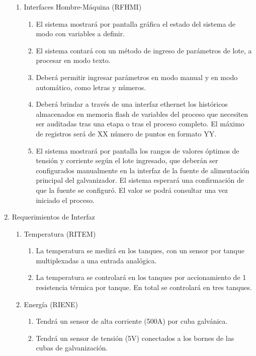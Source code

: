 \begin{enumerate}
\begin{enumerate}
\item Interfaces Hombre-Máquina (RFHMI) \footnotemark
\begin{enumerate}
\item El sistema mostrará por pantalla gráfica el estado del sistema de modo con variables a definir.
\item El sistema contará con un método de ingreso de parámetros de lote, a procesar en modo texto.
\item Deberá permitir ingresar parámetros en modo manual y en modo automático, como letras y números.
\item Deberá brindar a través de una interfaz ethernet los históricos almacenados en memoria flash de variables del proceso que necesiten ser auditadas tras una etapa o tras el proceso completo. El máximo de registros será de XX número de puntos en
formato YY. \footnotemark
\item El sistema mostrará por pantalla los rangos de valores óptimos de tensión y corriente según el lote ingresado, que deberán ser configurados manualmente en la interfaz de la fuente de alimentación principal del galvanizador. El sistema esperará una confirmación de que la fuente se configuró. El valor se podrá consultar una vez iniciado el proceso.
\end{enumerate}

\end{enumerate}

\item Requerimientos de Interfaz
\begin{enumerate}

\item Temperatura (RITEM)
\begin{enumerate}
\item La temperatura se medirá en los tanques, con un sensor por tanque multiplexadas a una entrada analógica.
\item La temperatura se controlará en los tanques por accionamiento de 1 resistencia térmica por tanque. En total se controlará en tres tanques.
\end{enumerate}

\item Energía (RIENE)
\begin{enumerate}
\item Tendrá un sensor de alta corriente (500A) por cuba galvánica.
\item Tendrá un sensor de tensión (5V) conectados a los bornes de las cubas de galvanización.
\end{enumerate}


\end{enumerate}
\end{enumerate}
